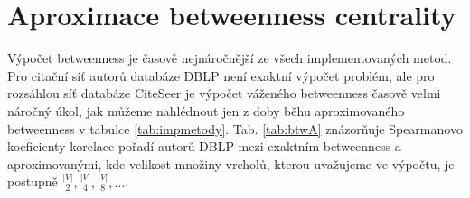 \documentclass{bakalarka}
\begin{document}
\begin{table}[!ht]
\centering
{}
\caption{Součty pořadí oceněných autorů pro CiteSeer}
\label{tab:oceneni2}
\end{table}


\section{Aproximace betweenness centrality}
Výpočet betweenness je časově nejnáročnější ze všech implementovaných metod.
Pro citační síť autorů databáze DBLP není exaktní výpočet problém, ale pro
rozsáhlou síť databáze CiteSeer je výpočet váženého betweenness časově velmi
náročný úkol, jak můžeme nahlédnout jen z doby běhu aproximovaného betweenness
v tabulce \ref{tab:impmetody}.  Tab. \ref{tab:btwA} znázorňuje Spearmanovo
koeficienty korelace pořadí autorů DBLP mezi exaktním betweenness a
aproximovanými, kde velikost množiny vrcholů, kterou uvažujeme ve výpočtu, je
postupně $\frac{|V|}{2}, \frac{|V|}{4}, \frac{|V|}{8}, \ldots$.


\begin{table}[!ht]
\begin{center}
\end{center}
\caption{Tabulka Spearmano koeficientů korelace mezi exaktním a aproximovaným betweenness}
\label{tab:btwA}
\end{table}
\end{document}
